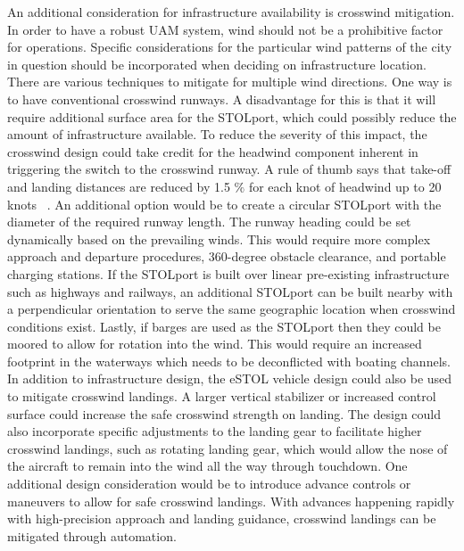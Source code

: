 \documentclass[]{aiaa-tc}%
\begin{document}
An additional consideration for infrastructure availability is crosswind mitigation. In order to have a robust UAM system, wind should not be a prohibitive factor for operations. Specific considerations for the particular wind patterns of the city in question should be incorporated when deciding on infrastructure location. There are various techniques to mitigate for multiple wind directions. One way is to have conventional crosswind runways. A disadvantage for this is that it will require additional surface area for the STOLport, which could possibly reduce the amount of infrastructure available. To reduce the severity of this impact, the crosswind design could take credit for the headwind component inherent in triggering the switch to the crosswind runway. A rule of thumb says that take-off and landing distances are reduced by 1.5 $\%$  for each knot of headwind up to 20 knots ~\cite{Headwind}. An additional option would be to create a circular STOLport with the diameter of the required runway length. The runway heading could be set dynamically based on the prevailing winds. This would require more complex approach and departure procedures, 360-degree obstacle clearance, and portable charging stations. If the STOLport is built over linear pre-existing infrastructure such as highways and railways, an additional STOLport can be built nearby with a perpendicular orientation to serve the same geographic location when crosswind conditions exist. Lastly, if barges are used as the STOLport then they could be moored to allow for rotation into the wind. This would require an increased footprint in the waterways which needs to be deconflicted with boating channels.
In addition to infrastructure design, the eSTOL vehicle design could also be used to mitigate crosswind landings. A larger vertical stabilizer or increased control surface could increase the safe crosswind strength on landing. The design could also incorporate specific adjustments to the landing gear to facilitate higher crosswind landings, such as rotating landing gear, which would allow the nose of the aircraft to remain into the wind all the way through touchdown. One additional design consideration would be to introduce advance controls or maneuvers to allow for safe crosswind landings. With advances happening rapidly with high-precision approach and landing guidance, crosswind landings can be mitigated through automation.
\end{document}
